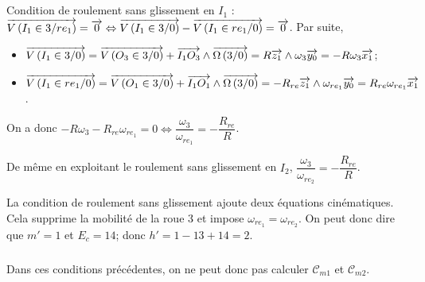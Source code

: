 \documentclass[10pt,fleqn]{article} %
\begin{document}
%

\subparagraph{}
Condition de roulement sans glissement en $I_1$ : $\overrightarrow{V\left( {I_1} \in {3}/{re_1}\right)} = \overrightarrow{0} \Leftrightarrow \overrightarrow{V\left( {I_1} \in {3}/{0}\right)}-\overrightarrow{V\left( {I_1} \in {re_1}/{0}\right)} = \overrightarrow{0}$. Par suite, 
\begin{itemize}
\item $\overrightarrow{V\left( {I_1} \in {3}/{0}\right)}=\overrightarrow{V\left( {O_3} \in {3}/{0}\right)}+\overrightarrow{I_1 O_3}\wedge \overrightarrow{\Omega\left( {3}/{0}\right)} = R\overrightarrow{z_1} \wedge \omega_3\overrightarrow{y_0}=-R\omega_3 \overrightarrow{x_1}$;
\item $\overrightarrow{V\left( {I_1} \in {re_1}/{0}\right)}=\overrightarrow{V\left( {O_1} \in {3}/{0}\right)}+\overrightarrow{I_1 O_1}\wedge \overrightarrow{\Omega\left( {3}/{0}\right)} = -R_{re}\overrightarrow{z_1} \wedge \omega_{re_1}\overrightarrow{y_0}=R_{re}\omega_{re_1} \overrightarrow{x_1}$.
\end{itemize}
On a donc $-R\omega_3 -R_{re}\omega_{re_1} =0 \Leftrightarrow\dfrac{\omega_3}{\omega_{re_1}}=-\dfrac{R_{re}}{R} $.

De même en exploitant le roulement sans glissement en $I_2$, $\dfrac{\omega_3}{\omega_{re_2}}=-\dfrac{R_{re}}{R} $. 

La condition de roulement sans glissement ajoute deux équations cinématiques. Cela supprime la mobilité de la roue 3 et impose $\omega_{re_1}=\omega_{re_2}$. 
On peut donc dire que $m'=1$ et $E_c=14$; donc $h'=1-13+14=2$. 

\subparagraph{}
Dans ces conditions précédentes, on ne peut donc pas calculer $\mathcal{C}_{m1}$ et $\mathcal{C}_{m2}$. 

\end{document}
